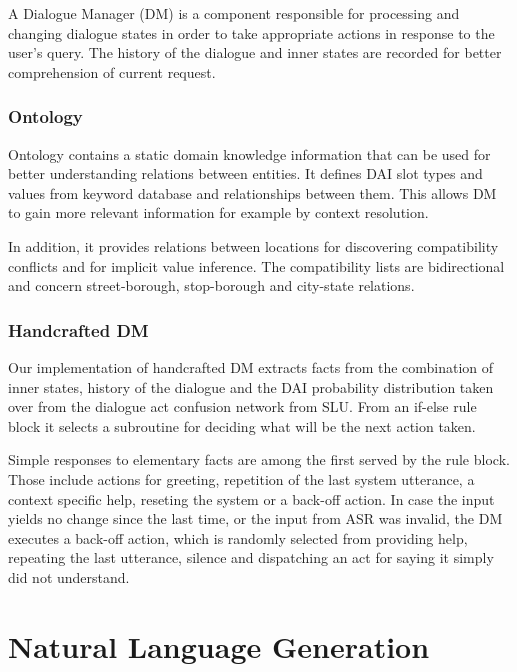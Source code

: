 A Dialogue Manager (DM) is a component responsible for processing and changing dialogue states in order to take appropriate actions in response to the user's query.
The history of the dialogue and inner states are recorded for better comprehension of current request.

\subsubsection{Ontology}

Ontology contains a static domain knowledge information that can be used for better understanding relations between entities.
It defines DAI slot types and values from keyword database and relationships between them.
This allows DM to gain more relevant information for example by context resolution.

In addition, it provides relations between locations for discovering compatibility conflicts and for implicit value inference.
The compatibility lists are bidirectional and concern street-borough, stop-borough and city-state relations.

\subsubsection{Handcrafted DM}

Our implementation of handcrafted DM extracts facts from the combination of inner states, history of the dialogue and the DAI probability distribution taken over from the dialogue act confusion network from SLU.
From an if-else rule block it selects a subroutine for deciding what will be the next action taken.

Simple responses to elementary facts are among the first served by the rule block.
Those include actions for greeting, repetition of the last system utterance, a context specific help, reseting the system or a back-off action.
In case the input yields no change since the last time, or the input from ASR was invalid, the DM executes a back-off action, which is randomly selected from providing help, repeating the last utterance, silence and dispatching an act for saying it simply did not understand.

\section{Natural Language Generation}

